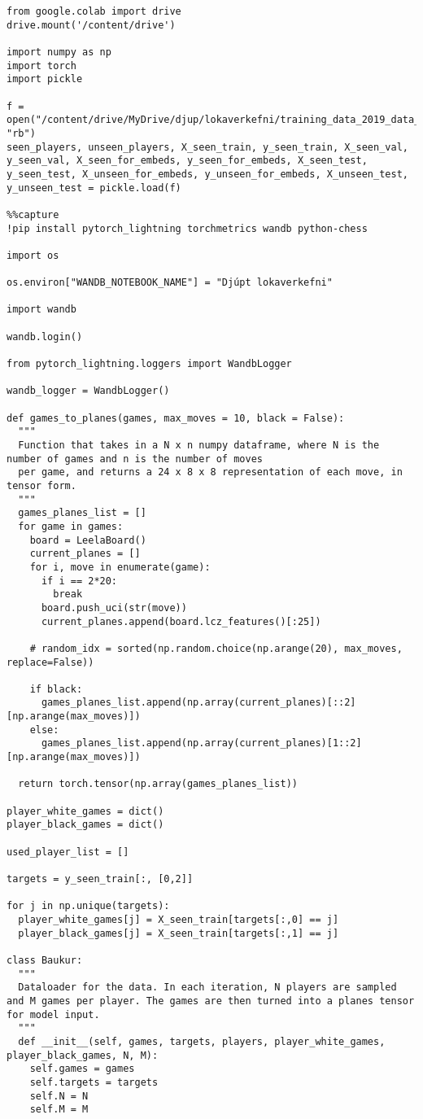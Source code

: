 \begin{verbatim}
from google.colab import drive
drive.mount('/content/drive')

import numpy as np
import torch
import pickle

f = open("/content/drive/MyDrive/djup/lokaverkefni/training_data_2019_data_100000_50.dat", "rb")
seen_players, unseen_players, X_seen_train, y_seen_train, X_seen_val, y_seen_val, X_seen_for_embeds, y_seen_for_embeds, X_seen_test, y_seen_test, X_unseen_for_embeds, y_unseen_for_embeds, X_unseen_test, y_unseen_test = pickle.load(f)

%%capture
!pip install pytorch_lightning torchmetrics wandb python-chess

import os

os.environ["WANDB_NOTEBOOK_NAME"] = "Djúpt lokaverkefni"

import wandb

wandb.login()

from pytorch_lightning.loggers import WandbLogger

wandb_logger = WandbLogger()

def games_to_planes(games, max_moves = 10, black = False):
  """
  Function that takes in a N x n numpy dataframe, where N is the number of games and n is the number of moves
  per game, and returns a 24 x 8 x 8 representation of each move, in tensor form.
  """
  games_planes_list = []
  for game in games:
    board = LeelaBoard()
    current_planes = []
    for i, move in enumerate(game):
      if i == 2*20:
        break
      board.push_uci(str(move))
      current_planes.append(board.lcz_features()[:25])

    # random_idx = sorted(np.random.choice(np.arange(20), max_moves, replace=False))

    if black:
      games_planes_list.append(np.array(current_planes)[::2][np.arange(max_moves)])
    else:
      games_planes_list.append(np.array(current_planes)[1::2][np.arange(max_moves)])

  return torch.tensor(np.array(games_planes_list))

player_white_games = dict()
player_black_games = dict()

used_player_list = []

targets = y_seen_train[:, [0,2]]

for j in np.unique(targets):
  player_white_games[j] = X_seen_train[targets[:,0] == j]
  player_black_games[j] = X_seen_train[targets[:,1] == j]

class Baukur:
  """
  Dataloader for the data. In each iteration, N players are sampled and M games per player. The games are then turned into a planes tensor for model input.
  """
  def __init__(self, games, targets, players, player_white_games, player_black_games, N, M):
    self.games = games
    self.targets = targets
    self.N = N
    self.M = M


\end{verbatim}
